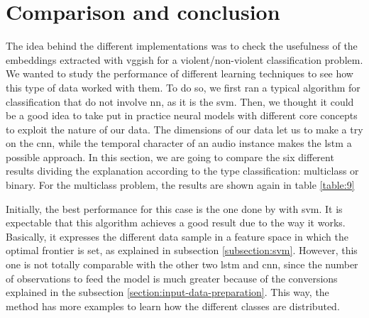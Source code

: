 \section{Comparison and conclusion}
	
	The idea behind the different implementations was to check the usefulness of the embeddings extracted with \acrshort{vgg}ish for a violent/non-violent classification problem. We wanted to study the performance of different learning techniques to see how this type of data worked with them. To do so, we first ran a typical algorithm for classification that do not involve \acrlong{nn}, as it is the \acrshort{svm}. Then, we thought it could be a good idea to take put in practice neural models with different core concepts to exploit the nature of our data. The dimensions of our data let us to make a try on the \acrshort{cnn}, while the temporal character of an audio instance makes the \acrshort{lstm} a possible approach. In this section, we are going to compare the six different results dividing the explanation according to the type classification: multiclass or binary. For the multiclass problem, the results are shown again in table \ref{table:9}
	
	\begin{table}[h!]
		\begin{center}
		\end{center}
		\caption{Accuracy results for the three different algorithms and the three sets}
		\label{table:9}
	\end{table}

	Initially, the best performance for this case is the one done by with \acrshort{svm}. It is expectable that this algorithm achieves a good result due to the way it works. Basically, it expresses the different data sample in a feature space in which the optimal frontier is set, as explained in subsection \ref{subsection:svm}. However, this one is not totally comparable with the other two \acrshort{lstm} and \acrshort{cnn}, since the number of observations to feed the model is much greater because of the conversions explained in the subsection \ref{section:input-data-preparation}. This way, the method has more examples to learn how the different classes are distributed.
	

